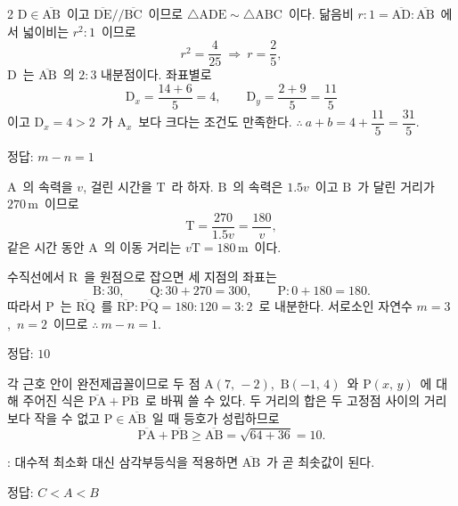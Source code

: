 \documentclass[10pt,fleqn]{article}   %
\begin{document}
\begin{multicols*}{2}
$\mathrm{D}\in\overline{\mathrm{AB}}$\ 이고 $\overline{\mathrm{DE}}\mathbin{/\!/}\overline{\mathrm{BC}}$\ 이므로 $\triangle\mathrm{ADE}\sim\triangle\mathrm{ABC}$\ 이다. 닮음비 $r:1=\overline{\mathrm{AD}}:\overline{\mathrm{AB}}$\ 에서 넓이비는 $r^2:1$\ 이므로
\[ r^2 = \dfrac{4}{25}\ \Longrightarrow\ r = \dfrac{2}{5}, \]
$\mathrm{D}$\ 는 $\overline{\mathrm{AB}}$\ 의 $2:3$ 내분점이다. 좌표별로
$$\mathrm{D}_x = \dfrac{14+6}{5} = 4,\qquad \mathrm{D}_y = \dfrac{2+9}{5} = \dfrac{11}{5}$$
이고 $\mathrm{D}_x = 4 > 2$\ 가 $\mathrm{A}_x$\ 보다 크다는 조건도 만족한다. $\therefore\ a + b = 4 + \dfrac{11}{5} = \dfrac{31}{5}$.
\begin{dmanswerbox}
정답: $m-n=1$
\end{dmanswerbox}

$\mathrm{A}$\ 의 속력을 $v$, 걸린 시간을 $\mathrm{T}$\ 라 하자. $\mathrm{B}$\ 의 속력은 $1.5v$\ 이고 $\mathrm{B}$\ 가 달린 거리가 $270\,\mathrm{m}$\ 이므로
\[ \mathrm{T} = \dfrac{270}{1.5v} = \dfrac{180}{v}, \]
같은 시간 동안 $\mathrm{A}$\ 의 이동 거리는 $v\mathrm{T} = 180\,\mathrm{m}$\ 이다.

수직선에서 $\mathrm{R}$\ 을 원점으로 잡으면 세 지점의 좌표는
$$\mathrm{B}:30,\qquad \mathrm{Q}:30+270=300,\qquad \mathrm{P}:0+180=180.$$
따라서 $\mathrm{P}$\ 는 $\overline{\mathrm{RQ}}$\ 를 $\overline{\mathrm{RP}}:\overline{\mathrm{PQ}}=180:120=3:2$\ 로 내분한다. 서로소인 자연수 $m=3$,\ $n=2$\ 이므로 $\therefore\ m - n = 1$.
\begin{dmanswerbox}
정답: $10$
\end{dmanswerbox}

각 근호 안이 완전제곱꼴이므로 두 점 $\mathrm{A}(7,\,-2)$,\ $\mathrm{B}(-1,\,4)$\ 와 $\mathrm{P}(x,\,y)$\ 에 대해 주어진 식은 $\overline{\mathrm{PA}}+\overline{\mathrm{PB}}$\ 로 바꿔 쓸 수 있다. 두 거리의 합은 두 고정점 사이의 거리보다 작을 수 없고 $\mathrm{P}\in\overline{\mathrm{AB}}$\ 일 때 등호가 성립하므로
\[ \overline{\mathrm{PA}} + \overline{\mathrm{PB}} \ge \overline{\mathrm{AB}} = \sqrt{64+36} = 10. \]

\begin{dmcriticalpoint}
: 대수적 최소화 대신 삼각부등식을 적용하면 $\overline{\mathrm{AB}}$\ 가 곧 최솟값이 된다.
\end{dmcriticalpoint}

\begin{dmanswerbox}
정답: $C<A<B$
\end{dmanswerbox}


\end{multicols*}
\end{document}
